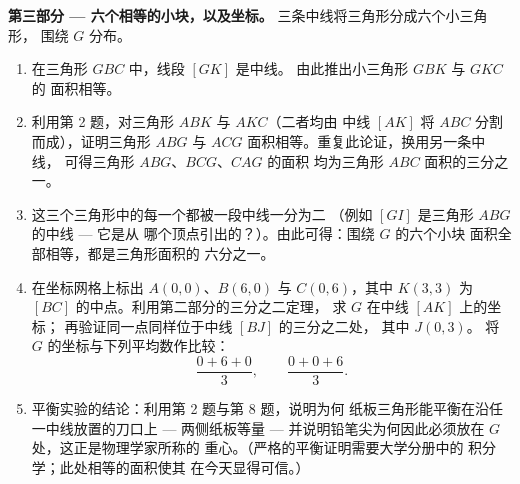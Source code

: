 \begin{problem}
\medskip
\noindent\textbf{第三部分 --- 六个相等的小块，以及坐标。}
三条中线将三角形分成六个小三角形，
围绕 $G$ 分布。
\begin{enumerate}[resume]
  \item 在三角形 $GBC$ 中，线段 $[GK]$ 是中线。
        由此推出小三角形 $GBK$ 与 $GKC$ 的
        面积相等。
  \item 利用第 2 题，对三角形 $ABK$ 与 $AKC$（二者均由
        中线 $[AK]$ 将 $ABC$ 分割而成），证明三角形 $ABG$ 与 $ACG$
        面积相等。重复此论证，换用另一条中线，
        可得三角形 $ABG$、$BCG$、$CAG$ 的面积
        均为三角形 $ABC$ 面积的三分之一。
  \item 这三个三角形中的每一个都被一段中线一分为二
        （例如 $[GI]$ 是三角形 $ABG$ 的中线 --- 它是从
        哪个顶点引出的？）。由此可得：围绕 $G$ 的六个小块
        面积全部相等，都是三角形面积的
        六分之一。
  \item 在坐标网格上标出 $A(0, 0)$、$B(6, 0)$ 与
        $C(0, 6)$，其中 $K(3, 3)$ 为 $[BC]$ 的中点。利用第二部分的三分之二定理，
        求 $G$ 在中线 $[AK]$ 上的坐标；
        再验证同一点同样位于中线 $[BJ]$ 的三分之二处，
        其中 $J(0, 3)$。
        将 $G$ 的坐标与下列平均数作比较：
        \[
        \frac{0 + 6 + 0}{3},
        \qquad
        \frac{0 + 0 + 6}{3} .
        \]
  \item 平衡实验的结论：利用第 2 题与第 8 题，说明为何
        纸板三角形能平衡在沿任一中线放置的刀口上 ---
        两侧纸板等量 ---
        并说明铅笔尖为何因此必须放在
        $G$ 处，这正是物理学家所称的
        重心。（严格的平衡证明需要大学分册中的
        积分学；此处相等的面积使其
        在今天显得可信。）
\end{enumerate}
\end{problem}
